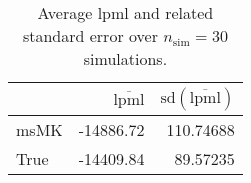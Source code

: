 \begin{table}[H]

\caption{Average lpml and related standard error over $n_{\text{sim}} = 30$ simulations.}
\centering
\begin{tabular}[t]{lrr}
\toprule
  & $\overbar{\text{lpml}}$ & $\text{sd}(\overbar{\text{lpml}})$\\
\midrule
msMK & -14886.72 & 110.74688\\
True & -14409.84 & 89.57235\\
\bottomrule
\end{tabular}
\end{table}